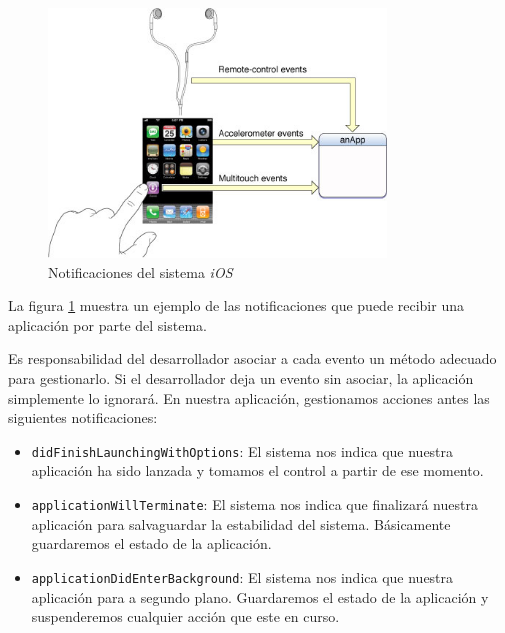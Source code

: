  \begin{figure} [h]
  \centering
    \includegraphics[width=0.8\textwidth]{./images/events_to_app.jpg}
  \caption{Notificaciones del sistema \emph{iOS} }
  \label{fig:iOSnotify}
\end{figure}

 La figura \ref{fig:iOSnotify} muestra un ejemplo de las notificaciones que puede recibir una aplicación por parte del sistema.
 
    Es responsabilidad del desarrollador asociar a cada evento un método adecuado para gestionarlo. Si el desarrollador deja un evento sin asociar, la aplicación simplemente lo ignorará. En nuestra aplicación, gestionamos acciones antes las siguientes notificaciones:
    
\begin{itemize}
	\item \lstinline{didFinishLaunchingWithOptions}: El sistema nos indica que nuestra aplicación ha sido lanzada y tomamos el control a partir de ese momento. 
 	\item \lstinline{applicationWillTerminate}: El sistema nos indica que finalizará nuestra aplicación para salvaguardar la estabilidad del sistema. Básicamente guardaremos el estado de la aplicación.
	\item \lstinline{applicationDidEnterBackground}: El sistema nos indica que nuestra aplicación para a segundo plano. Guardaremos el estado de la aplicación y suspenderemos cualquier acción que este en curso.
\end{itemize} 
    
    
